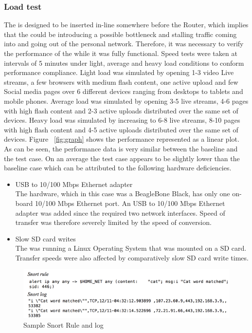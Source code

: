 \subsubsection{Load test}
\label{sec:eval:loadtest}
The \nodename is designed to be inserted in-line somewhere before the Router, which implies that the \nodename could be introducing a possible bottleneck and stalling traffic coming into and going out of the personal network. Therefore, it was necessary to verify the performance of the \nodename while it was fully functional. Speed tests were taken at intervals of 5 minutes under light, average and heavy load conditions to conform performance compliance. Light load was simulated by opening 1-3 video Live streams, a few browsers with medium flash content, one active upload and few Social media pages over 6 different devices ranging from desktops to tablets and mobile phones. Average load was simulated by opening 3-5 live streams, 4-6 pages with high flash content and 2-3 active uploads distributed over the same set of devices. Heavy load was simulated by increasing to 6-8 live streams, 8-10 pages with high flash content and 4-5 active uploads distributed over the same set of devices. Figure ~\ref{fig:graph} shows the performance represented as a linear plot. As can be seen, the performance data is very similar between the baseline and the test case. On an average the test case appears to be slightly lower than the baseline case which can be attributed to the following hardware deficiencies.\\
\begin{itemize}
    \item USB to 10/100 Mbps Ethernet adapter\\
    The \nodename hardware, which in this case was a BeagleBone Black, has only one on-board 10/100 Mbps Ethernet port. An USB to 10/100 Mbps Ethernet adapter was added since the \nodename required two network interfaces. Speed of transfer was therefore severely limited by the speed of conversion.
    \item Slow SD card writes\\
    The \nodename was running a Linux Operating System that was mounted on a SD card. Transfer speeds were also affected by comparatively slow SD card write times.
\end{itemize}
\begin{figure}
    \centering
    \includegraphics[width=0.95\linewidth]{figs/catrule.png}
    \caption{Sample Snort Rule and log}
    \label{fig:snortrule}
\end{figure}

